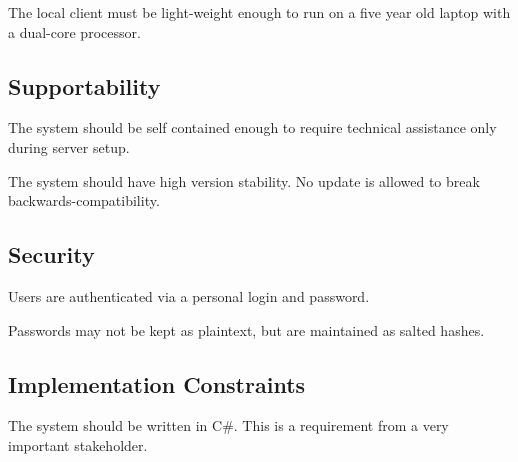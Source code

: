 The local client must be light-weight enough to run on a five year old laptop with a dual-core processor.

\subsection{Supportability}
The system should be self contained enough to require technical assistance only during server setup.

The system should have high version stability. No update is allowed to break backwards-compatibility.

\subsection{Security}
Users are authenticated via a personal login and password.

Passwords may not be kept as plaintext, but are maintained as salted hashes.

\subsection{Implementation Constraints}
The system should be written in C\#. This is a requirement from a very important stakeholder.
